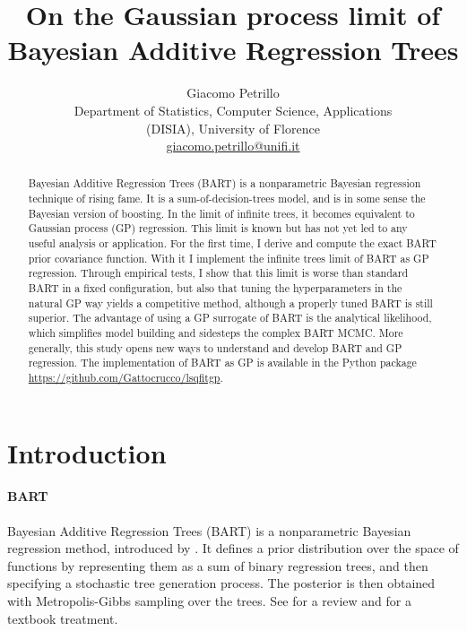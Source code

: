 \documentclass[a4paper]{article}
\title{On the Gaussian process limit of Bayesian Additive Regression Trees}
\author{Giacomo Petrillo\\Department of Statistics, Computer Science,
Applications\\(DISIA), University of Florence\\
\href{mailto:giacomo.petrillo@unifi.it}{giacomo.petrillo@unifi.it}}
\theoremstyle{definition}
\begin{document}
    
    \maketitle
    
    \begin{abstract}
        
        Bayesian Additive Regression Trees (BART) is a nonparametric Bayesian regression technique of rising fame. It is a sum-of-decision-trees model, and is in some sense the Bayesian version of boosting. In the limit of infinite trees, it becomes equivalent to Gaussian process (GP) regression. This limit is known but has not yet led to any useful analysis or application. For the first time, I derive and compute the exact BART prior covariance function. With it I implement the infinite trees limit of BART as GP regression. Through empirical tests, I show that this limit is worse than standard BART in a fixed configuration, but also that tuning the hyperparameters in the natural GP way yields a competitive method, although a properly tuned BART is still superior. The advantage of using a GP surrogate of BART is the analytical likelihood, which simplifies model building and sidesteps the complex BART MCMC. More generally, this study opens new ways to understand and develop BART and GP regression. The implementation of BART as GP is available in the Python package \url{https://github.com/Gattocrucco/lsqfitgp}.
        
    \end{abstract}
    
    \section{Introduction}

    \paragraph{BART}
        
    Bayesian Additive Regression Trees (BART) is a nonparametric Bayesian regression method, introduced by \textcite{chipman2006,chipman2010}. It defines a prior distribution over the space of functions by representing them as a sum of binary regression trees, and then specifying a stochastic tree generation process. The posterior is then obtained with Metropolis-Gibbs sampling over the trees. See \textcite{hill2020} for a review and \textcite[ch.~5]{daniels2023} for a textbook treatment.
\end{document}
